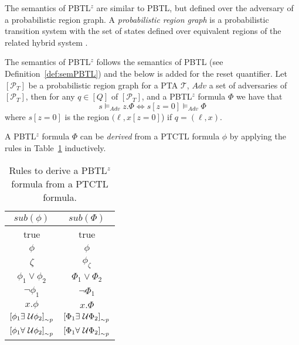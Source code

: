 The semantics of PBTL$^{z}$ are similar to PBTL, but defined over the adversary of a probabilistic region graph. A \emph{probabilistic region graph} \cite{Courcoubetis1993} is a probabilistic transition system with the set of states defined over equivalent regions of the related hybrid system \cite{Sproston2001}.

\begin{defi}
The semantics of PBTL$^{z}$ follows the semantics of PBTL (see Definition~\ref{def:semPBTL}) and the below is added for the reset quantifier. Let $[\mathcal{P}_{T}]$ be a probabilistic region graph for a PTA $\mathcal{T}$, $Adv$ a set of adversaries of $[\mathcal{P}_{T}]$, then for any $q\in[Q]$ of $[\mathcal{P}_{T}]$, and a PBTL$^{z}$ formula $\Phi$ we have that
\[
s\models_{Adv} z.\Phi \Leftrightarrow s[z=0] \models_{Adv} \Phi
\]
where $s[z=0]$ is the region $(\ell,x[z=0]$) if $q=(\ell,x)$.
\end{defi}

\begin{defi}
A PBTL$^{z}$ formula $\Phi$ can be \emph{derived} from a PTCTL formula $\phi$ by applying the  rules in Table~\ref{tab:ptctl2pbtl} inductively.
\begin{table}[H]
\begin{center}
    \begin{tabular}{c|c}
        $sub(\phi)$ & $sub(\Phi)$ \\ \hline
        true & true \\ \hline
        $\phi$ & $\phi$ \\ \hline
        $\zeta$ & $\phi_{\zeta}$ \\ \hline
        $\phi_{1} \lor \phi_{2}$ & $\Phi_{1} \lor \Phi_{2}$ \\ \hline
        $\lnot \phi_{1}$ & $\lnot \Phi_{1}$ \\ \hline
        $x.\phi$ & $x.\Phi$ \\ \hline
        $\left[\phi_{1} \exists\ \mathcal{U} \phi_{2}\right]_{\sim p}$ & $\left[\Phi_{1} \exists\ \mathcal{U} \Phi_{2}\right]_{\sim p}$ \\ \hline
        $\left[\phi_{1} \forall\ \mathcal{U} \phi_{2}\right]_{\sim p}$ & $\left[\Phi_{1} \forall\ \mathcal{U} \Phi_{2}\right]_{\sim p}$ \\
    \end{tabular}
    \caption{Rules to derive a PBTL$^{z}$ formula from a PTCTL formula.}
    \label{tab:ptctl2pbtl}
\end{center}
\end{table}
\end{defi}

